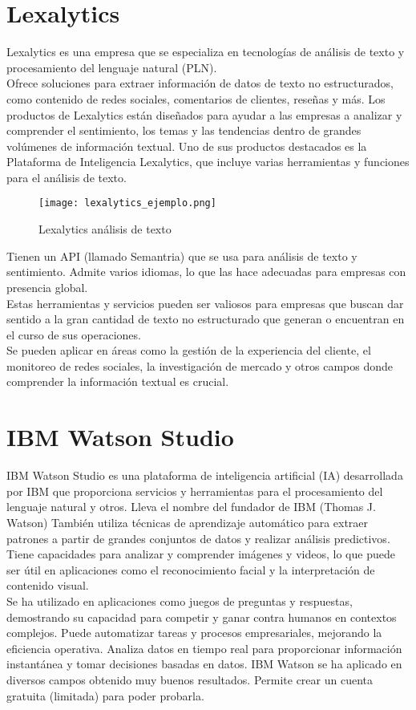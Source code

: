 \section{Lexalytics~\cite{lexalytics}}
Lexalytics es una empresa que se especializa en tecnologías de análisis de texto y 
procesamiento del lenguaje natural (PLN).\\
Ofrece soluciones para extraer información de datos de texto no estructurados, 
como contenido de redes sociales, comentarios de clientes, reseñas y más. 
Los productos de Lexalytics están diseñados para ayudar a las empresas a analizar 
y comprender el sentimiento, los temas y las tendencias dentro de grandes volúmenes de información textual.
Uno de sus productos destacados es la Plataforma de Inteligencia Lexalytics, 
que incluye varias herramientas y funciones para el análisis de texto.
\begin{figure}[h]
    \advance{} 
    \texttt{[image: lexalytics\_ejemplo.png]}
    \caption{Lexalytics análisis de texto}
\end{figure}
Tienen un API (llamado Semantria) que se usa para análisis de texto y sentimiento.
Admite varios idiomas, lo que las hace adecuadas para empresas con presencia global.\\
Estas herramientas y servicios pueden ser valiosos para empresas que 
buscan dar sentido a la gran cantidad de texto no estructurado que generan o 
encuentran en el curso de sus operaciones. \\Se pueden aplicar en áreas como la gestión 
de la experiencia del cliente, el monitoreo de redes sociales, la investigación de mercado 
y otros campos donde comprender la información textual es crucial.

\newpage
\section{IBM Watson Studio~\cite{ibmwatson}}
IBM Watson Studio es una plataforma de inteligencia artificial (IA) desarrollada 
por IBM que proporciona servicios y herramientas para el procesamiento 
del lenguaje natural y otros. 
Lleva el nombre del fundador de IBM (Thomas J. Watson)
También utiliza técnicas de aprendizaje automático 
para extraer patrones a partir de grandes conjuntos de datos y realizar análisis predictivos.\\
Tiene capacidades para analizar y comprender imágenes y videos, lo que puede 
ser útil en aplicaciones como el reconocimiento facial y la interpretación de contenido visual.\\
Se ha utilizado en aplicaciones como juegos de preguntas y 
respuestas, demostrando su capacidad para competir y ganar contra humanos en contextos complejos.
Puede automatizar tareas y procesos empresariales, mejorando la eficiencia operativa.
Analiza datos en tiempo real para proporcionar información instantánea y tomar decisiones basadas en datos.
IBM Watson se ha aplicado en diversos campos obtenido muy buenos resultados.
Permite crear un cuenta gratuita (limitada) para poder probarla.

